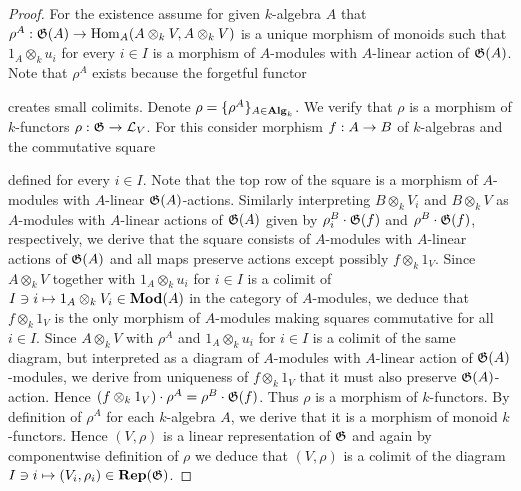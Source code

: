 \begin{proof}
For the existence assume for given $k$-algebra $A$ that $\rho^A:{\mathfrak G}(A) \rightarrow \mathrm{Hom}_A(A\otimes_kV,A\otimes_kV)$ is a unique morphism of monoids such that $1_A\otimes_ku_i$ for every $i\in I$ is a morphism of $A$-modules with $A$-linear action of ${\mathfrak G}(A)$. Note that $\rho^A$ exists because the forgetful functor
\begin{center}
\end{center}
creates small colimits. Denote $\rho = \{\rho^A\}_{A\in \mathbf{Alg}_k}$. We verify that $\rho$ is a morphism of $k$-functors $\rho:{\mathfrak G}\rightarrow {\mathcal L}_V$. For this consider morphism $f:A\rightarrow B$ of $k$-algebras and the commutative square
\begin{center}
\end{center}
defined for every $i\in I$. Note that the top row of the square is a morphism of $A$-modules with $A$-linear ${\mathfrak G}(A)$-actions. Similarly interpreting $B\otimes_kV_i$ and $B\otimes_kV$ as $A$-modules with $A$-linear actions of ${\mathfrak G}(A)$ given by $\rho^B_i\cdot {\mathfrak G}(f)$ and $\rho^B\cdot {\mathfrak G}(f)$, respectively, we derive that the square consists of $A$-modules with $A$-linear actions of ${\mathfrak G}(A)$ and all maps preserve actions except possibly $f\otimes_k1_V$. Since $A\otimes_kV$ together with $1_A\otimes_ku_i$ for $i\in I$ is a colimit of $I\ni i \mapsto 1_A\otimes_kV_i\in \mathbf{Mod}(A)$ in the category of $A$-modules, we deduce that $f\otimes_k1_V$ is the only morphism of $A$-modules making squares commutative for all $i\in I$. Since $A\otimes_kV$ with $\rho^A$ and $1_A\otimes_k u_i$ for $i\in I$ is a colimit of the same diagram, but interpreted as a diagram of $A$-modules with $A$-linear action of ${\mathfrak G}(A)$-modules, we derive from uniqueness of $f\otimes_k1_V$ that it must also preserve ${\mathfrak G}(A)$-action. Hence $\left(f\otimes_k1_V\right)\cdot \rho^A = \rho^B\cdot {\mathfrak G}(f)$. Thus $\rho$ is a morphism of $k$-functors. By definition of $\rho^A$ for each $k$-algebra $A$, we derive that it is a morphism of monoid $k$-functors. Hence $(V,\rho)$ is a linear representation of ${\mathfrak G}$ and again by componentwise definition of $\rho$ we deduce that $(V,\rho)$ is a colimit of the diagram $I\ni i\mapsto (V_i,\rho_i)\in \mathbf{Rep}({\mathfrak G})$. 

\end{proof}
